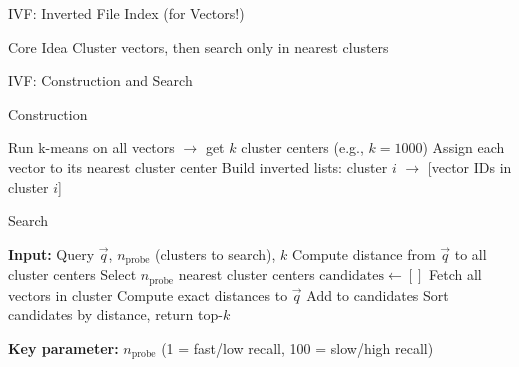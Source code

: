 \documentclass[aspectratio=169]{beamer}
\begin{document}

\begin{frame}[shrink=10]{IVF: Inverted File Index (for Vectors!)}
\begin{block}{Core Idea}
Cluster vectors, then search only in nearest clusters
\end{block}

\vspace{0.5em}

\begin{center}

\end{center}
\end{frame}

\begin{frame}[shrink=20]{IVF: Construction and Search}
\begin{block}{Construction}
\begin{algorithmic}[1]
\STATE Run k-means on all vectors $\rightarrow$ get $k$ cluster centers (e.g., $k=1000$)
\STATE Assign each vector to its nearest cluster center
\STATE Build inverted lists: cluster $i$ $\rightarrow$ [vector IDs in cluster $i$]
\end{algorithmic}
\end{block}

\vspace{1em}

\begin{block}{Search}
\begin{algorithmic}[1]
\STATE \textbf{Input:} Query $\vec{q}$, $n_{\text{probe}}$ (clusters to search), $k$
\STATE Compute distance from $\vec{q}$ to all cluster centers
\STATE Select $n_{\text{probe}}$ nearest cluster centers
\STATE $\text{candidates} \gets []$
    \STATE Fetch all vectors in cluster
    \STATE Compute exact distances to $\vec{q}$
    \STATE Add to candidates
\ENDFOR
\STATE Sort candidates by distance, return top-$k$
\end{algorithmic}
\end{block}

\vspace{0.5em}

\textbf{Key parameter:} $n_{\text{probe}}$ (1 = fast/low recall, 100 = slow/high recall)
\end{frame}
\end{document}
